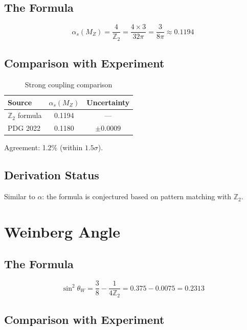 \documentclass[12pt,a4paper]{article}
\begin{document}
\subsection{The Formula}

\begin{equation}
\alpha_s(M_Z) = \frac{4}{\mathbb{Z}_2} = \frac{4 \times 3}{32\pi} = \frac{3}{8\pi} \approx 0.1194
\end{equation}

\subsection{Comparison with Experiment}

\begin{table}[h]
\centering
\begin{tabular}{lcc}
\toprule
Source & $\alpha_s(M_Z)$ & Uncertainty \\
\midrule
$\mathbb{Z}_2$ formula & 0.1194 & --- \\
PDG 2022 & 0.1180 & $\pm 0.0009$ \\
\bottomrule
\end{tabular}
\caption{Strong coupling comparison}
\end{table}

Agreement: 1.2\% (within $1.5\sigma$).

\subsection{Derivation Status}

Similar to $\alpha$: the formula is conjectured based on pattern matching with $\mathbb{Z}_2$.

\section{Weinberg Angle}

\subsection{The Formula}

\begin{equation}
\sin^2\theta_W = \frac{3}{8} - \frac{1}{4\mathbb{Z}_2} = 0.375 - 0.0075 = 0.2313
\end{equation}

\subsection{Comparison with Experiment}
\end{document}
